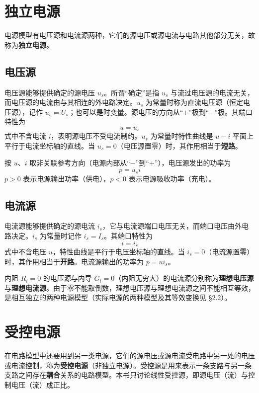 \section{独立电源}
电源模型有电压源和电流源两种，它们的源电压或源电流与电路其他部分无关，故称为\textbf{独立电源}。

\subsection{电压源}
电压源能够提供确定的源电压 $u_s$。所谓“确定”是指 $u_s$ 与流过电压源的电流无关，而电压源的电流由与其相连的外电路决定。$u_s$ 为常量时称为直流电压源（恒定电压源），记作 $u_s=U_s$；也可以是时变量。源电压的方向从“$+$”极到“$-$”极。其端口特性为
\begin{equation}
u=u_s
\end{equation}
式中不含电流 $i$，表明源电压不受电流制约。$u_s$ 为常量时特性曲线是 $u-i$ 平面上平行于电流坐标轴的直线。当 $u_s=0$（电压源置零）时，其作用相当于\textbf{短路}。

按 $u$、$i$ 取非关联参考方向（电源内部从“$-$”到“$+$”），电压源发出的功率为
\begin{equation}
p=u_si
\end{equation}
$p>0$ 表示电源输出功率（供电），$p<0$ 表示电源吸收功率（充电）。

\subsection{电流源}
电流源能够提供确定的源电流 $i_s$，它与电流源端口电压无关，而端口电压由外电路决定。$i_s$ 为常量时记作 $i_s=I_s$。其端口特性为
\begin{equation}
i=i_s
\end{equation}
式中不含电压 $u$，特性曲线是平行于电压坐标轴的直线。当 $i_s=0$（电流源置零）时，其作用相当于\textbf{开路}。电流源输出的功率为 $p=ui_s$。

内阻 $R_i=0$ 的电压源与内导 $G_i=0$（内阻无穷大）的电流源分别称为\textbf{理想电压源}与\textbf{理想电流源}。由于零不能取倒数，理想电压源与理想电流源之间不能相互等效，是相互独立的两种电源模型（实际电源的两种模型及其等效变换见 §2.2）。


\section{受控电源}
在电路模型中还要用到另一类电源，它们的源电压或源电流受电路中另一处的电压或电流控制，称为\textbf{受控电源}（非独立电源）。受控源是用来表示一条支路与另一条支路之间存在\textbf{耦合}关系的电路模型。本书只讨论线性受控源，即源电压（流）与控制电压（流）成正比。

